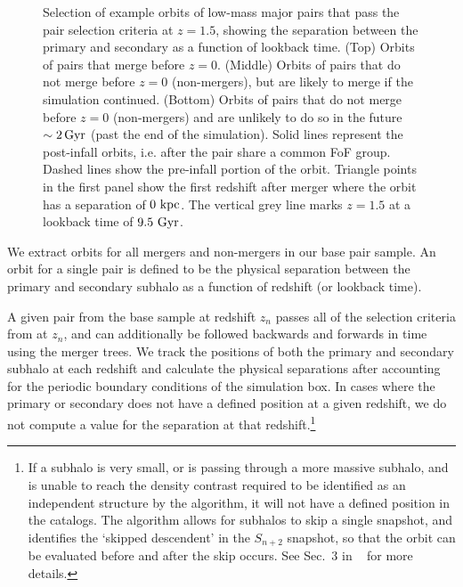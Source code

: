 \documentclass[twocolumn,linenumbers]{aastex631}
\newcommand{\chambe}{\citet{Chamberlain2024}}
\begin{document}
\begin{figure}[tb]
\begin{center}
    \caption{Selection of example orbits of low-mass major pairs that pass the pair selection criteria at $z=1.5$, showing the separation between the primary and secondary as a function of lookback time. 
    (Top) Orbits of pairs that merge before $z=0$.
    (Middle) Orbits of pairs that do not merge before $z=0$ (non-mergers), but are likely to merge if the simulation continued. 
    (Bottom) Orbits of pairs that do not merge before $z=0$ (non-mergers) and are unlikely to do so in the future $\sim2\mathrm{\,Gyr}$ (past the end of the simulation).
    Solid lines represent the post-infall orbits, i.e. after the pair share a common FoF group.
    Dashed lines show the pre-infall portion of the orbit. 
    Triangle points in the first panel show the first redshift after merger where the orbit has a separation of $0\,\mathrm{\,kpc}$.
    The vertical grey line marks $z=1.5$ at a lookback time of $9.5\,\mathrm{\,Gyr}$. 
    }
    \label{fig:example-orbits}
    \end{center}
\end{figure}

We extract orbits for all mergers and non-mergers in our base pair sample. 
An orbit for a single pair is defined to be the physical separation between the primary and secondary subhalo as a function of redshift (or lookback time).

A given pair from the base sample at redshift $z_n$ passes all of the selection criteria from \chambe{} at $z_n$, and can additionally be followed backwards and forwards in time using the \sublink{} merger trees. 
We track the positions of both the primary and secondary subhalo at each redshift and calculate the physical separations after accounting for the periodic boundary conditions of the simulation box.
In cases where the primary or secondary does not have a defined position at a given redshift, we do not compute a value for the separation at that redshift.\footnote{If a subhalo is very small, or is passing through a more massive subhalo, and is unable to reach the density contrast required to be identified as an independent structure by the \subfind{} algorithm, it will not have a defined position in the \sublink{} catalogs. The \sublink{} algorithm allows for subhalos to skip a single snapshot, and identifies the `skipped descendent' in the $S_{n+2}$ snapshot, so that the orbit can be evaluated before and after the skip occurs. See Sec.~3 in ~\citet{RG2015} for more details.}
\end{document}
